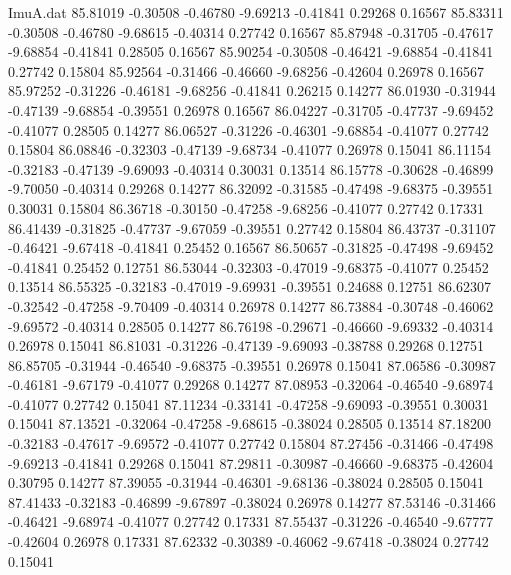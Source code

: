 \begin{filecontents}{ImuA.dat}
  85.81019   -0.30508   -0.46780   -9.69213   -0.41841    0.29268    0.16567
  85.83311   -0.30508   -0.46780   -9.68615   -0.40314    0.27742    0.16567
  85.87948   -0.31705   -0.47617   -9.68854   -0.41841    0.28505    0.16567
  85.90254   -0.30508   -0.46421   -9.68854   -0.41841    0.27742    0.15804
  85.92564   -0.31466   -0.46660   -9.68256   -0.42604    0.26978    0.16567
  85.97252   -0.31226   -0.46181   -9.68256   -0.41841    0.26215    0.14277
  86.01930   -0.31944   -0.47139   -9.68854   -0.39551    0.26978    0.16567
  86.04227   -0.31705   -0.47737   -9.69452   -0.41077    0.28505    0.14277
  86.06527   -0.31226   -0.46301   -9.68854   -0.41077    0.27742    0.15804
  86.08846   -0.32303   -0.47139   -9.68734   -0.41077    0.26978    0.15041
  86.11154   -0.32183   -0.47139   -9.69093   -0.40314    0.30031    0.13514
  86.15778   -0.30628   -0.46899   -9.70050   -0.40314    0.29268    0.14277
  86.32092   -0.31585   -0.47498   -9.68375   -0.39551    0.30031    0.15804
  86.36718   -0.30150   -0.47258   -9.68256   -0.41077    0.27742    0.17331
  86.41439   -0.31825   -0.47737   -9.67059   -0.39551    0.27742    0.15804
  86.43737   -0.31107   -0.46421   -9.67418   -0.41841    0.25452    0.16567
  86.50657   -0.31825   -0.47498   -9.69452   -0.41841    0.25452    0.12751
  86.53044   -0.32303   -0.47019   -9.68375   -0.41077    0.25452    0.13514
  86.55325   -0.32183   -0.47019   -9.69931   -0.39551    0.24688    0.12751
  86.62307   -0.32542   -0.47258   -9.70409   -0.40314    0.26978    0.14277
  86.73884   -0.30748   -0.46062   -9.69572   -0.40314    0.28505    0.14277
  86.76198   -0.29671   -0.46660   -9.69332   -0.40314    0.26978    0.15041
  86.81031   -0.31226   -0.47139   -9.69093   -0.38788    0.29268    0.12751
  86.85705   -0.31944   -0.46540   -9.68375   -0.39551    0.26978    0.15041
  87.06586   -0.30987   -0.46181   -9.67179   -0.41077    0.29268    0.14277
  87.08953   -0.32064   -0.46540   -9.68974   -0.41077    0.27742    0.15041
  87.11234   -0.33141   -0.47258   -9.69093   -0.39551    0.30031    0.15041
  87.13521   -0.32064   -0.47258   -9.68615   -0.38024    0.28505    0.13514
  87.18200   -0.32183   -0.47617   -9.69572   -0.41077    0.27742    0.15804
  87.27456   -0.31466   -0.47498   -9.69213   -0.41841    0.29268    0.15041
  87.29811   -0.30987   -0.46660   -9.68375   -0.42604    0.30795    0.14277
  87.39055   -0.31944   -0.46301   -9.68136   -0.38024    0.28505    0.15041
  87.41433   -0.32183   -0.46899   -9.67897   -0.38024    0.26978    0.14277
  87.53146   -0.31466   -0.46421   -9.68974   -0.41077    0.27742    0.17331
  87.55437   -0.31226   -0.46540   -9.67777   -0.42604    0.26978    0.17331
  87.62332   -0.30389   -0.46062   -9.67418   -0.38024    0.27742    0.15041
\end{filecontents}

